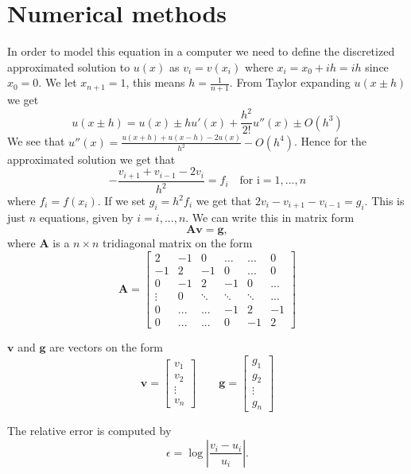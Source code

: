 \documentclass[10pt]{article}
\begin{document}
\section{Numerical methods}
In order to model this equation in a computer we need to define the 
discretized approximated solution to $ u(x) $ as $v_i=v(x_i) $ where
 $x_i=x_0+ih=ih$ since $x_0=0$. We let $x_{n+1}=1$, this means $h=\frac{1}{n+1}$.
 From Taylor expanding $u(x\pm h)$ we get 
 $$u(x\pm h)=u(x)\pm hu'(x)+\frac{h^2}{2!}u''(x)\pm O(h^3)$$
We see that $u''(x)=\frac{u(x+h)+u(x-h)-2u(x)}{h^2}-O(h^4)$. Hence for the approximated solution
 we get that $$-\frac{v_{i+1}+v_{i-1}-2v_i}{h^2}=f_i\quad \text{for i}=1,...,n$$ where $f_i=f(x_i)$. 
 If we set $g_i=h^2f_i$ we get that $2v_i-v_{i+1}-v_{i-1}=g_i$. 
 This is just $n$ equations, given by $i=i,...,n$. We can write this in matrix form 
 $$\mathbf{A}\mathbf{v}=\mathbf{g}, $$ where $\mathbf{A}$ is a $n\times n$ 
 tridiagonal matrix on the form $$\mathbf{A}=\begin{bmatrix}
   2 & -1 & 0 & \dots & ... & 0 \\
   -1 & 2 & -1 & 0 & ... & 0 \\
   0  & -1 & 2 & -1 & 0 & ... \\
   \vdots & 0 & \ddots & \ddots & \ddots & ...\\
   0 & ... & ... & -1 & 2 & -1\\
   0 & ... & ... & 0 & -1 & 2 
 \end{bmatrix}$$

 $\mathbf{v}$ and $\mathbf{g}$ are vectors on the form 
 $$\mathbf{v}=\begin{bmatrix}
   v_1\\v_2\\\vdots\\v_n
 \end{bmatrix}
 \qquad
 \mathbf{g}=\begin{bmatrix}
   g_1\\g_2\\\vdots\\g_n
 \end{bmatrix}
 $$

 The relative error is computed by $$ \epsilon=\log{\left|\frac{v_{i}-u_{i}}{u_{i}}\right|}.$$
\end{document}
